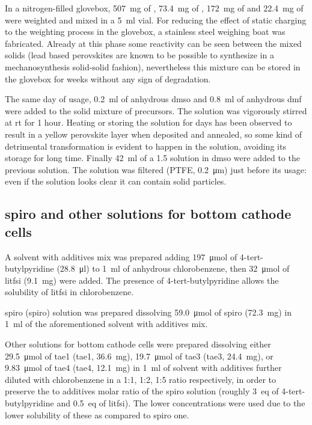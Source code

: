 		In a nitrogen-filled glovebox, \SI{507}{\mg} of \PbItwo, \SI{73.4}{\mg} of \PbBrtwo, \SI{172}{\mg} of  and \SI{22.4}{\mg} of  were weighted and mixed in a \SI{5}{\ml} vial. For reducing the effect of static charging to the weighting process in the glovebox, a stainless steel weighing boat was fabricated. Already at this phase some reactivity can be seen between the mixed solids (lead based perovskites are known to be possible to synthesize in a mechanosynthesis solid-solid fashion), nevertheless this mixture can be stored in the glovebox for weeks without any sign of degradation.
		
		The same day of usage, \SI{0.2}{\ml} of anhydrous \gls{dmso} and \SI{0.8}{\ml} of anhydrous \gls{dmf} were added to the solid mixture of precursors. The solution was vigorously stirred at \gls{rt} for 1 hour. Heating or storing the solution for days has been observed to result in a yellow perovskite layer when deposited and annealed, so some kind of detrimental transformation is evident to happen in the solution, avoiding its storage for long time. Finally \SI{42}{\ml} of
		a \SI{1.5}{\Molar} \CsI solution in \gls{dmso} were added to the previous solution. The solution was filtered (PTFE, \SI{0.2}{\um}) just before its usage: even if the solution looks clear it can contain solid particles.

	\subsection{\Gls{spiro} and other  solutions for bottom cathode cells}
	
		A solvent with additives mix was prepared adding \SI{197}{\umol} of 4-tert-butylpyridine (\SI{28.8}{\ul}) to \SI{1}{\ml} of anhydrous chlorobenzene, then \SI{32}{\umol} of \gls{litfsi} (\SI{9.1}{\mg}) were added. The presence of 4-tert-butylpyridine allows the solubility of \gls{litfsi} in chlorobenzene.
		
		\Glsdesc{spiro} (\gls{spiro})  solution was prepared dissolving \SI{59.0}{\umol} of \gls{spiro} (\SI{72.3}{\mg}) in \SI{1}{\ml} of the aforementioned solvent with additives mix.

		Other  solutions for bottom cathode cells were prepared dissolving either \SI{29.5}{\umol} of \glsdesc{tae1} (\gls{tae1}, \SI{36.6}{\mg}), \SI{19.7}{\umol} of \glsdesc{tae3} (\gls{tae3}, \SI{24.4}{\mg}), or \SI{9.83}{\umol} of \glsdesc{tae4} (\gls{tae4}, \SI{12.1}{\mg}) in \SI{1}{\ml} of solvent with additives further diluted with chlorobenzene in a 1:1, 1:2, 1:5 ratio respectively, in order to preserve the  to additives molar ratio of the \gls{spiro} solution (roughly \SI{3}{eq} of 4-tert-butylpyridine and \SI{0.5}{eq} of \gls{litfsi}). The lower concentrations were used due to the lower solubility of these  as compared to \gls{spiro} one.

